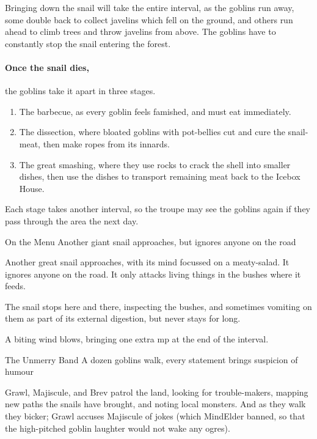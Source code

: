 Bringing down the snail will take the entire \gls{interval}, as the goblins run away, some double back to collect javelins which fell on the ground, and others run ahead to climb trees and throw javelins from above.
The goblins have to constantly stop the snail entering the forest.

\paragraph{Once the snail dies,}
the goblins take it apart in three stages.

\begin{enumerate}
  \item
  The barbecue, as every goblin feels famished, and must eat immediately.
  \item
  The dissection, where bloated goblins with pot-bellies cut and cure the snail-meat, then make ropes from its innards.
  \item
  The great smashing, where they use rocks to crack the shell into smaller dishes, then use the dishes to transport remaining meat back to the Icebox House.
\end{enumerate}

Each stage takes another \gls{interval}, so the troupe may see the goblins again if they pass through the area the next day.

{On the Menu}%
{Another giant snail approaches, but ignores anyone on the road}%

Another great snail approaches, with its mind focussed on a meaty-salad.
It ignores anyone on the road.
It only attacks living things in the bushes where it feeds.

The snail stops here and there, inspecting the bushes, and sometimes vomiting on them as part of its external digestion, but never stays for long.

A biting wind blows, bringing one extra \gls{mp} at the end of the \gls{interval}.

{The Unmerry Band}%
{A dozen goblins walk, every statement brings suspicion of humour}%

Grawl, Majiscule, and Brev patrol the land, looking for trouble-makers, mapping new paths the snails have brought, and noting local monsters.
And as they walk they bicker; Grawl accuses Majiscule of jokes (which \gls{MindElder} banned, so that the high-pitched goblin laughter would not wake any \glspl{ogre}).

